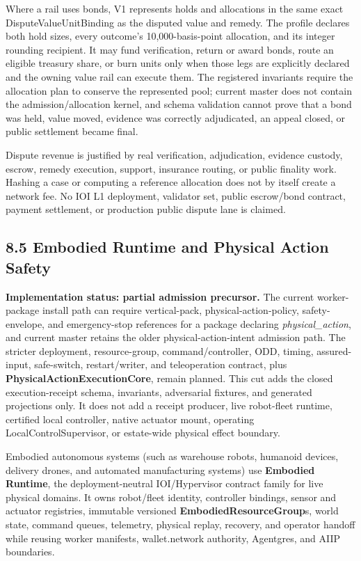 \documentclass[
  11pt,
]{article}
\begin{document}
Where a rail uses bonds, V1 represents holds and allocations in the same exact
DisputeValueUnitBinding as the disputed value and remedy. The profile declares
both hold sizes, every outcome's 10,000-basis-point allocation, and its integer
rounding recipient. It may fund verification, return or award bonds, route an
eligible treasury share, or burn units only when those legs are explicitly
declared and the owning value rail can execute them. The registered invariants
require the allocation plan to conserve the represented pool; current master
does not contain the admission/allocation kernel, and schema validation cannot
prove that a bond was held, value moved, evidence was correctly adjudicated,
an appeal closed, or public settlement became final.

Dispute revenue is justified by real verification, adjudication, evidence
custody, escrow, remedy execution, support, insurance routing, or public
finality work. Hashing a case or computing a reference allocation does not by
itself create a network fee. No IOI L1 deployment, validator set, public
escrow/bond contract, payment settlement, or production public dispute lane is
claimed.

\hypertarget{the-embodied-autonomous-labor-profile}{%
\subsection{8.5 Embodied Runtime and Physical Action
Safety}\label{the-embodied-autonomous-labor-profile}}

\textbf{Implementation status: partial admission precursor.} The current
worker-package install path can require vertical-pack,
physical-action-policy, safety-envelope, and emergency-stop references for a
package declaring \emph{physical\_action}, and current master retains the older
physical-action-intent admission path. The stricter deployment,
resource-group, command/controller, ODD, timing, assured-input, safe-switch,
restart/writer, and teleoperation contract, plus
\textbf{PhysicalActionExecutionCore}, remain planned. This cut adds the closed
execution-receipt schema, invariants, adversarial fixtures, and generated
projections only. It does not add a receipt producer, live robot-fleet runtime,
certified local controller, native actuator mount, operating
LocalControlSupervisor, or estate-wide physical effect boundary.

Embodied autonomous systems (such as warehouse robots, humanoid devices,
delivery drones, and automated manufacturing systems) use
\textbf{Embodied Runtime}, the deployment-neutral IOI/Hypervisor contract
family for live physical domains. It owns robot/fleet identity, controller bindings, sensor and
actuator registries, immutable versioned \textbf{EmbodiedResourceGroup}s,
world state, command queues, telemetry, physical replay, recovery, and operator
handoff while reusing worker manifests,
wallet.network authority, Agentgres, and AIIP boundaries.
\end{document}
